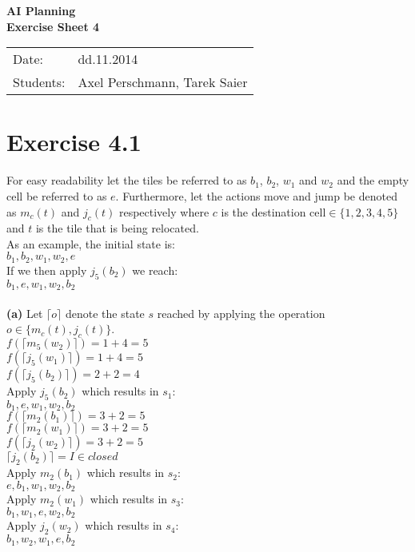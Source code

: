 \documentclass[11pt,a4paper]{article}
\begin{document}
\begin{center}
\Huge{\textbf{AI Planning}}\\
\LARGE{\textbf{Exercise Sheet 4}}
\end{center}
\vspace{2cm}
\begin{tabular}{ll}
Date: & dd.11.2014\\
Students: & Axel Perschmann, Tarek Saier
\end{tabular}

\section*{Exercise 4.1}
For easy readability let the tiles be referred to as $b_1$, $b_2$, $w_1$ and $w_2$ and the empty cell be referred to as $e$. Furthermore, let the actions move and jump be denoted as $m_c(t)$ and $j_c(t)$ respectively where $c$ is the destination cell$\in \{1,2,3,4,5\}$ and $t$ is the tile that is being relocated.\\
As an example, the initial state is:\\
$b_1,b_2,w_1,w_2,e$\\
If we then apply $j_5(b_2)$ we reach:\\
$b_1,e,w_1,w_2,b_2$\\
\\
\textbf{(a)} Let $\lceil o\rceil$ denote the state $s$ reached by applying the operation $o\in \{m_c(t),j_c(t)\}$.\\
$f(\lceil m_5(w_2)\rceil)=1+4=5$\\
$f(\lceil j_5(w_1)\rceil)=1+4=5$\\
$f(\lceil j_5(b_2)\rceil)=2+2=4$\\
Apply $j_5(b_2)$ which results in $s_1$:\\
$b_1,e,w_1,w_2,b_2$\\
$f(\lceil m_2(b_1)\rceil)=3+2=5$\\
$f(\lceil m_2(w_1)\rceil)=3+2=5$\\
$f(\lceil j_2(w_2)\rceil)=3+2=5$\\
$\lceil j_2(b_2)\rceil=I\in closed$\\
Apply $m_2(b_1)$ which results in $s_2$:\\
$e,b_1,w_1,w_2,b_2$\\
Apply $m_2(w_1)$ which results in $s_3$:\\
$b_1,w_1,e,w_2,b_2$\\
Apply $j_2(w_2)$ which results in $s_4$:\\
$b_1,w_2,w_1,e,b_2$\\
\end{document}
